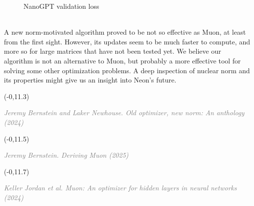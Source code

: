 \documentclass[a0]{a0poster}
\def\Head#1{\noindent{\LARGE\color{black} #1}\bigskip}
\begin{document}
\begin{textblock}{7.0}
\begin{figure}[h]
    \caption{NanoGPT validation loss}
    \label{fig:nanogpt_val_loss}
\end{figure}
\medskip
\Head{Conclusion}\\
A new norm-motivated algorithm proved to be not so effective as Muon, at least from the first sight. However, its updates seem to be much faster to compute, and more so for large matrices that have not been tested yet. We believe our algorithm is not an alternative to Muon, but probably a more effective tool for solving some other optimization problems. A deep inspection of nuclear norm and its properties might give us an insight into Neon's future.

\medskip

\end{textblock}

\begin{textblock}{6}(-0,11.3)
    \footnotesize
    \raggedright
    \textcolor{gray}{\emph{Jeremy Bernstein and Laker Newhouse. Old optimizer, new norm: An anthology (2024)}}
    \end{textblock}
    
    \begin{textblock}{6}(-0,11.5)
    \footnotesize
    \raggedright
    \textcolor{gray}{\emph{Jeremy Bernstein. Deriving Muon (2025)}}
    \end{textblock}
    
    \begin{textblock}{6}(-0,11.7)
    \footnotesize
    \raggedright
    \textcolor{gray}{\emph{Keller Jordan et al. Muon: An optimizer for hidden layers in neural networks (2024)}}
    \end{textblock}
    
\end{document}
